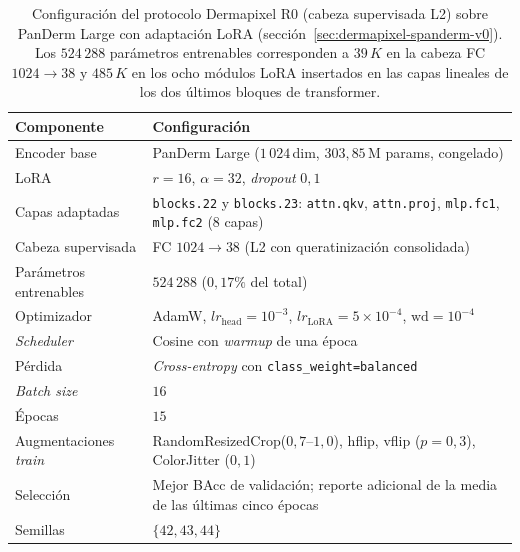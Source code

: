 \begin{table}[H]
\centering
\footnotesize
\setlength{\tabcolsep}{4pt}
\renewcommand{\arraystretch}{0.95}
\caption{Configuración del protocolo Dermapixel R0 (cabeza
supervisada L2) sobre PanDerm
Large con adaptación LoRA (sección~\ref{sec:dermapixel-spanderm-v0}).
Los $524\,288$ parámetros
entrenables corresponden a $39\,K$ en la cabeza FC
$1024 \to 38$ y $485\,K$ en los ocho módulos LoRA insertados en
las capas lineales de los dos últimos bloques de transformer.}
\label{tab:dermapixel-spanderm-config}
\begin{tabular}{ll}
\hline
Componente                  & Configuración \\
\hline
Encoder base                & PanDerm Large ($1\,024$\,dim, $303{,}85$\,M params, congelado) \\
LoRA                        & $r=16$, $\alpha=32$, \emph{dropout} $0{,}1$ \\
Capas adaptadas             & \texttt{blocks.22} y \texttt{blocks.23}: \texttt{attn.qkv}, \texttt{attn.proj}, \texttt{mlp.fc1}, \texttt{mlp.fc2} (8 capas) \\
Cabeza supervisada          & FC $1024 \to 38$ (L2 con queratinización consolidada) \\
Parámetros entrenables      & $524\,288$ ($0{,}17\%$ del total) \\
Optimizador                 & AdamW, $lr_{\mathrm{head}} = 10^{-3}$, $lr_{\mathrm{LoRA}} = 5 \times 10^{-4}$, $\mathrm{wd} = 10^{-4}$ \\
\emph{Scheduler}            & Cosine con \emph{warmup} de una época \\
Pérdida                     & \emph{Cross-entropy} con \texttt{class\_weight=balanced} \\
\emph{Batch size}           & $16$ \\
Épocas                      & $15$ \\
Augmentaciones \emph{train} & RandomResizedCrop($0{,}7$--$1{,}0$), hflip, vflip ($p=0{,}3$), ColorJitter ($0{,}1$) \\
Selección                   & Mejor BAcc de validación; reporte adicional de la media de las últimas cinco épocas \\
Semillas                    & $\{42, 43, 44\}$ \\
\hline
\end{tabular}
\end{table}

